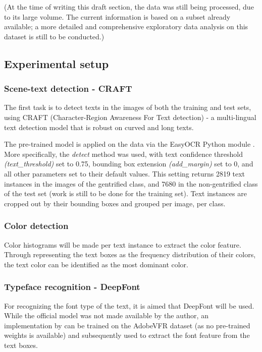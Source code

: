 (At the time of writing this draft section, the data was still being processed, due to its large volume. The current information is based on a subset already available; a more detailed and comprehensive exploratory data analysis on this dataset is still to be conducted.)

\subsection{Experimental setup}
\subsubsection{Scene-text detection - CRAFT}
The first task is to detect texts in the images of both the training and test sets, using CRAFT (Character-Region Awareness For Text detection) \cite{baek_character_2019} - a multi-lingual text detection model that is robust on curved and long texts.

The pre-trained model is applied on the data via the EasyOCR Python module \cite{noauthor_jaided_nodate}. More specifically, the \textit{detect} method was used, with text confidence threshold \textit{(text\_threshold)} set to 0.75, bounding box extension \textit{(add\_margin)} set to 0, and all other parameters set to their default values. This setting returns 2819 text instances in the images of the gentrified class, and 7680 in the non-gentrified class of the test set (work is still to be done for the training set). Text instances are cropped out by their bounding boxes and grouped per image, per class. 

\subsubsection{Color detection}
Color histograms \cite{srivastava_review_2015} will be made per text instance to extract the color feature. Through representing the text boxes as the frequency distribution of their colors, the text color can be identified as the most dominant color.

\subsubsection{Typeface recognition - DeepFont}
For recognizing the font type of the text, it is aimed that DeepFont \cite{wang_deepfont_2015} will be used. While the official model was not made available by the author, an implementation by \cite{reni_font_2023} can be trained on the AdobeVFR dataset \cite{wang_deepfont_2015} (as no pre-trained weights is available) and subsequently used to extract the font feature from the text boxes.

